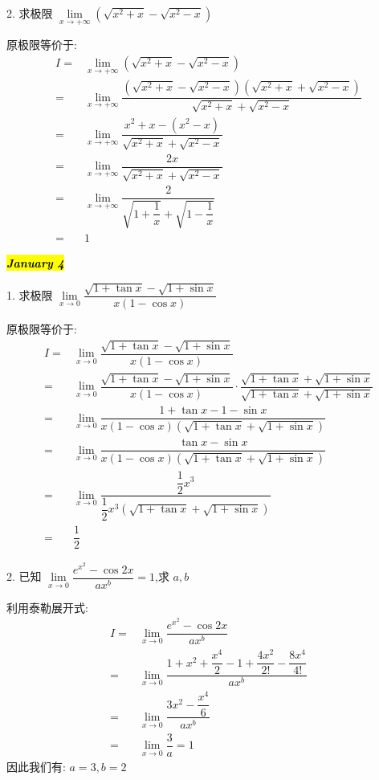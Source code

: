 2. 求极限 $\lim\limits_{x\to+\infty}(\sqrt{x^{2}+x}-\sqrt{x^{2}-x})$
\begin{solution}

	原极限等价于:
	\begin{align*}
		I = & \lim\limits_{x\to+\infty}(\sqrt{x^{2}+x}-\sqrt{x^{2}-x})\\
		  = & \lim\limits_{x\to+\infty}\dfrac{(\sqrt{x^{2}+x}-\sqrt{x^{2}-x})(\sqrt{x^{2}+x}+\sqrt{x^{2}-x})}{\sqrt{x^{2}+x}+\sqrt{x^{2}-x}}\\
		  = & \lim\limits_{x\to+\infty}\dfrac{x^{2}+x-(x^{2}-x)}{\sqrt{x^{2}+x}+\sqrt{x^{2}-x}}\\
		  = & \lim\limits_{x\to+\infty}\dfrac{2x}{\sqrt{x^{2}+x}+\sqrt{x^{2}-x}}\\
		  = & \lim\limits_{x\to+\infty}\dfrac{2}{\sqrt{1+\dfrac{1}{x}}+\sqrt{1-\dfrac{1}{x}}}\\
		  = & 1
	\end{align*}
\end{solution}

\hl{\textbf{\textit{January 4}}}

1. 求极限 $\lim\limits_{x\to 0}\dfrac{\sqrt{1+\tan x}-\sqrt{1+\sin x}}{x(1-\cos x)}$
\begin{solution}

	原极限等价于:
	\begin{align*}
		I = & \lim\limits_{x\to 0}\dfrac{\sqrt{1+\tan x}-\sqrt{1+\sin x}}{x(1-\cos x)}\\
		  = & \lim\limits_{x\to 0}\dfrac{\sqrt{1+\tan x}-\sqrt{1+\sin x}}{x(1-\cos x)}\cdot \dfrac{\sqrt{1+\tan x}+\sqrt{1+\sin x}}{\sqrt{1+\tan x}+\sqrt{1+\sin x}}\\
		  = & \lim\limits_{x\to 0}\dfrac{1+\tan x-1-\sin x}{x(1-\cos x)(\sqrt{1+\tan x}+\sqrt{1+\sin x})}\\
		  = & \lim\limits_{x\to 0}\dfrac{\tan x-\sin x}{x(1-\cos x)(\sqrt{1+\tan x}+\sqrt{1+\sin x})}\\
		  = & \lim\limits_{x\to 0}\dfrac{\dfrac{1}{2}x^{3}}{\dfrac{1}{2}x^{3}(\sqrt{1+\tan x}+\sqrt{1+\sin x})}\\
		  = & \dfrac{1}{2}
	\end{align*}
\end{solution}

2. 已知 $\lim\limits_{x\to 0}\dfrac{e^{x^{2}}-\cos 2x}{ax^{b}}=1$,求 $a,b$
\begin{solution}

	利用泰勒展开式:
	\begin{align*}
		I = & \lim\limits_{x\to 0}\dfrac{e^{x^{2}}-\cos 2x}{ax^{b}}\\
		  = & \lim\limits_{x\to 0}\dfrac{1+x^{2}+\dfrac{x^{4}}{2}-1+\dfrac{4x^{2}}{2!}-\dfrac{8x^{4}}{4!}}{ax^{b}}\\
		  = & \lim\limits_{x\to 0}\dfrac{3x^{2}-\dfrac{x^{4}}{6}}{ax^{b}}\\
		  = & \lim\limits_{x\to 0}\dfrac{3}{a} = 1
	\end{align*}
	因此我们有: $a = 3, b = 2$
\end{solution}

